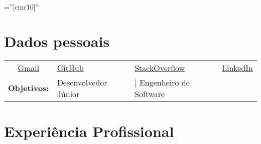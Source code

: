 \documentclass[a4paper,10pt]{article} %
\begin{document}
\pagestyle{empty} %

\font\fb=''[cmr10]'' %


\par{\bigskip\par} %

\section{Dados pessoais}

\begin{tabular}{clll}

	\faEnvelopeO \thinspace \href{mailto:yurimathe.yp@gmail.com}{Gmail}
	& \faGithub \thinspace \href{https://github.com/Yuri-M-Dias}{GitHub}
	& \faStackOverflow \thinspace \href{http://stackoverflow.com/users/story/3312701}{StackOverflow}
	& \faLinkedin \thinspace \href{https://www.linkedin.com/in/yuri-pereira-b5b589a8/}{LinkedIn} \\

	\bf Objetivos: & Desenvolvedor Júnior & | Engenheiro de Software & \\
\end{tabular}


\section{Experiência Profissional}
\end{document}

